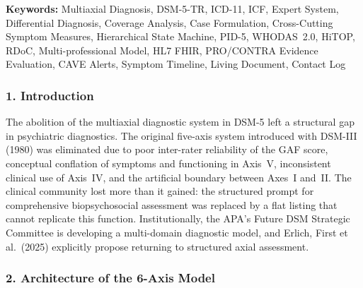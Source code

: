 \documentclass[11pt,a4paper]{article}
\begin{document}
\textbf{Keywords:} Multiaxial Diagnosis, DSM-5-TR, ICD-11, ICF, Expert System, Differential Diagnosis, Coverage Analysis, Case Formulation, Cross-Cutting Symptom Measures, Hierarchical State Machine, PID-5, WHODAS~2.0, HiTOP, RDoC, Multi-professional Model, HL7 FHIR, PRO/CONTRA Evidence Evaluation, CAVE Alerts, Symptom Timeline, Living Document, Contact Log

\subsubsection*{1. Introduction}

The abolition of the multiaxial diagnostic system in DSM-5 left a structural gap in psychiatric diagnostics. The original five-axis system introduced with DSM-III (1980) was eliminated due to poor inter-rater reliability of the GAF score, conceptual conflation of symptoms and functioning in Axis~V, inconsistent clinical use of Axis~IV, and the artificial boundary between Axes~I and~II. The clinical community lost more than it gained: the structured prompt for comprehensive biopsychosocial assessment was replaced by a flat listing that cannot replicate this function. Institutionally, the APA's Future DSM Strategic Committee is developing a multi-domain diagnostic model, and Erlich, First et al.\ (2025) explicitly propose returning to structured axial assessment.

\subsubsection*{2. Architecture of the 6-Axis Model}
\end{document}
